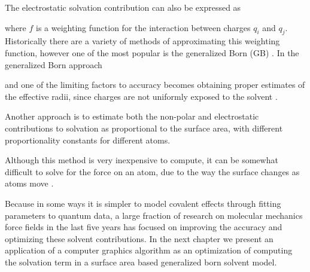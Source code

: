 The electrostatic solvation contribution can also be expressed as

where $f$ is a weighting function for the interaction between charges $q_i$ and $q_j$.
Historically there are a variety of methods of approximating this weighting function, however one of the most popular is the generalized Born (GB) \cite{still1990semianalytical}.
In the generalized Born approach

and one of the limiting factors to accuracy becomes obtaining proper estimates of the effective radii, since charges are not uniformly exposed to the solvent \cite{schaefer1996comprehensive}.

Another approach is to estimate both the non-polar and electrostatic contributions to solvation as proportional to the surface area, with different proportionality constants for different atoms.

Although this method is very inexpensive to compute, it can be somewhat difficult to solve for the force on an atom, due to the way the surface changes as atoms move \cite{roux1999implicit}.

Because in some ways it is simpler to model covalent effects through fitting parameters to quantum data, a large fraction of research on molecular mechanics force fields in the last five years has focused on improving the accuracy and optimizing these solvent contributions.
In the next chapter we present an application of a computer graphics algorithm as an optimization of computing the solvation term in a surface area based generalized born solvent model. 
